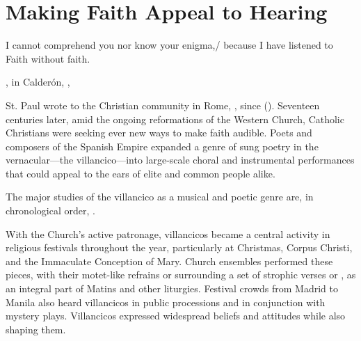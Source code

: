 %
%
%

\chapter{Making Faith Appeal to Hearing}

\label{ch:faith-hearing}

\epigraph
{I cannot comprehend you nor know your enigma,/ because I have listened to Faith without faith.}
{, in Calderón, , \textlinenums{13\XXX--\XXX}}

St. Paul wrote to the Christian community in Rome, , since  ().
Seventeen centuries later, amid the ongoing reformations of the Western Church, Catholic Christians were seeking ever new ways to make faith audible.
Poets and composers of the Spanish Empire expanded a genre of sung poetry in the vernacular---the villancico---into large-scale choral and instrumental performances that could appeal to the ears of elite and common people alike.%
\begin{Footnote}
  The major studies of the villancico as a musical and poetic genre are, in chronological order, \autocites{Rubio:Forma}{Laird:VC}{Torrente:PhD}{Tenorio:SorJuana}
  {CaberoPueyo:PhD}{Illari:Polychoral}{Knighton-Torrente:VCs}
  {Cashner:Cards}{Cashner:PhD}.
\end{Footnote}

With the Church's active patronage, villancicos became a central activity in religious festivals throughout the year, particularly at Christmas, Corpus Christi, and the Immaculate Conception of Mary.
Church ensembles performed these pieces, with their motet-like refrains or  surrounding a set of strophic verses or , as an integral part of Matins and other liturgies.
Festival crowds from Madrid to Manila also heard villancicos in public processions and in conjunction with mystery plays.
Villancicos expressed widespread beliefs and attitudes while also shaping them.

